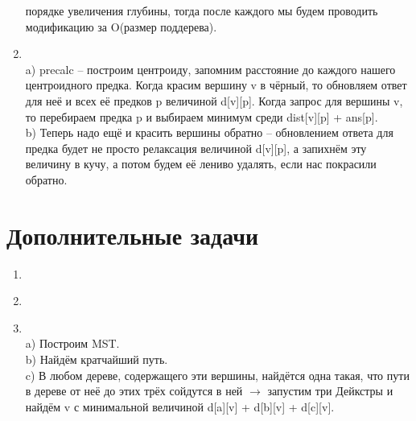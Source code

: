 \documentclass[12pt]{article}
\begin{document}
\begin{enumerate}
    порядке увеличения глубины, тогда после каждого мы будем проводить модификацию за O(размер поддерева). \\
    \item ~\\
    a) precalc -- построим центроиду, запомним расстояние до каждого нашего центроидного предка. Когда красим вершину v в чёрный, то обновляем ответ 
    для неё и всех её предков p величиной d[v][p]. Когда запрос для вершины v, то перебираем предка p и выбираем минимум среди dist[v][p] + ans[p]. \\
    b) Теперь надо ещё и красить вершины обратно -- обновлением ответа для предка будет не просто релаксация величиной d[v][p], а запихнём эту величину в кучу, 
    а потом будем её лениво удалять, если нас покрасили обратно. \\
\end{enumerate}

\section{Дополнительные задачи}

\begin{enumerate}
    \setlength{\parskip}{0pt} 
    \setlength{\itemsep}{0pt} 
    \item ~\\
    \item ~\\
    \item ~\\
    a) Построим MST. \\
    b) Найдём кратчайший путь. \\
    c) В любом дереве, содержащего эти вершины, найдётся одна такая, что пути в дереве от неё до этих трёх сойдутся в ней $\to$ запустим 
    три Дейкстры и найдём v с минимальной величиной d[a][v] + d[b][v] + d[c][v]. \\
\end{enumerate}
\end{document}
